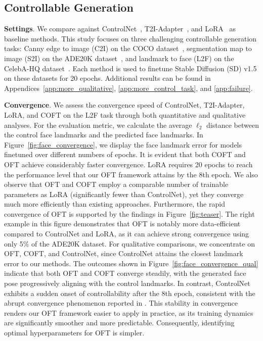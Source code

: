 \subsection{Controllable Generation}

\textbf{Settings}. We compare against ControlNet~\cite{zhang2023adding}, T2I-Adapter~\cite{mou2023t2i}, and LoRA~\cite{hulora2022} as baseline methods. This study focuses on three challenging controllable generation tasks: Canny edge to image (C2I) on the COCO dataset~\cite{lin2014microsoft}, segmentation map to image (S2I) on the ADE20K dataset~\cite{zhou2017scene}, and landmark to face (L2F) on the CelebA-HQ dataset~\cite{karras2018progressive,xia2021tedigan}. Each method is used to finetune Stable Diffusion (SD) v1.5 on these datasets for 20 epochs. Additional results can be found in Appendices~\ref{app:more_qualitative}, \ref{app:more_control_task}, and \ref{app:failure}.

\textbf{Convergence}. We assess the convergence speed of ControlNet, T2I-Adapter, LoRA, and COFT on the L2F task through both quantitative and qualitative analyses. For the evaluation metric, we calculate the average $\ell_2$ distance between the control face landmarks and the predicted face landmarks. In Figure~\ref{fig:face_convergence}, we display the face landmark error for models finetuned over different numbers of epochs. It is evident that both COFT and OFT achieve considerably faster convergence. LoRA requires 20 epochs to reach the performance level that our OFT framework attains by the 8th epoch. We also observe that OFT and COFT employ a comparable number of trainable parameters as LoRA (significantly fewer than ControlNet), yet they converge much more efficiently than existing approaches. Furthermore, the rapid convergence of OFT is supported by the findings in Figure~\ref{fig:teaser}. The right example in this figure demonstrates that OFT is notably more data-efficient compared to ControlNet and LoRA, as it can achieve strong convergence using only 5\% of the ADE20K dataset. For qualitative comparisons, we concentrate on OFT, COFT, and ControlNet, since ControlNet attains the closest landmark error to our methods. The outcomes shown in Figure~\ref{fig:face_convergence_qual} indicate that both OFT and COFT converge steadily, with the generated face pose progressively aligning with the control landmarks. In contrast, ControlNet exhibits a sudden onset of controllability after the 8th epoch, consistent with the abrupt convergence phenomenon reported in \cite{zhang2023adding}. This stability in convergence renders our OFT framework easier to apply in practice, as its training dynamics are significantly smoother and more predictable. Consequently, identifying optimal hyperparameters for OFT is simpler.

